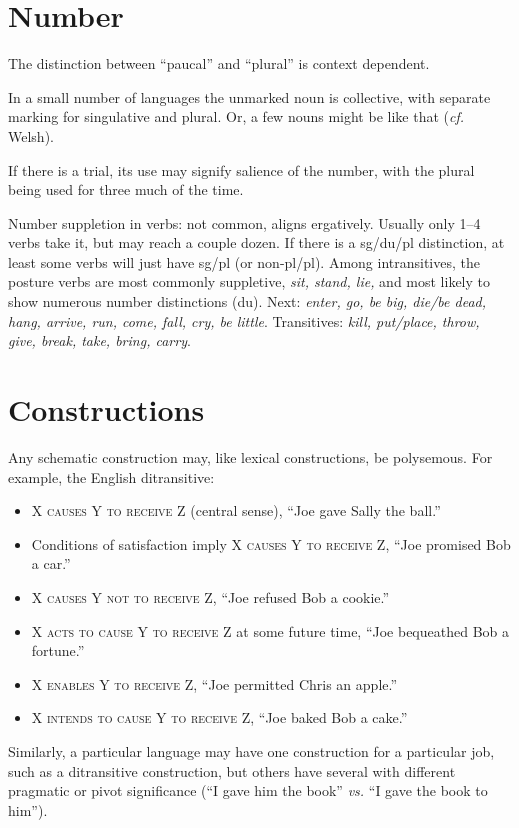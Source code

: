 \documentclass[11pt]{article}
\newcommand{\I}[1]{\textsc{#1}}   %
\newenvironment{grammarlist}%
 {\begin{itemize}\addtolength{\itemsep}{-0.5\baselineskip}\ignorespaces}%
 {\end{itemize}\ignorespacesafterend}
\begin{document}
\section{Number}
The distinction between ``paucal'' and ``plural'' is context
dependent. 

In a small number of languages the unmarked noun is collective, with
separate marking for singulative and plural.  Or, a few nouns might be
like that (\textit{cf.} Welsh).

If there is a trial, its use may signify salience of the number, with
the plural being used for three much of the time.

Number suppletion in verbs: not common, aligns ergatively.  Usually
only 1--4 verbs take it, but may reach a couple dozen.  If there is a
sg/du/pl distinction, at least some verbs will just have sg/pl (or
non-pl/pl).  Among intransitives, the posture verbs are most commonly
suppletive, \textit{sit, stand, lie,} and most likely to show numerous
number distinctions (du).  Next: \textit{enter, go, be big, die/be
  dead, hang, arrive, run, come, fall, cry, be little}.  Transitives:
\textit{kill, put/place, throw, give, break, take, bring, carry}.


\section{Constructions}
Any schematic construction may, like lexical constructions, be
polysemous.  For example, the English ditransitive:

\begin{grammarlist}
  \item \I{X causes Y to receive Z} (central sense), ``Joe gave Sally
    the ball.''
  \item Conditions of satisfaction imply \I{X causes Y to receive Z},
    ``Joe promised Bob a car.''
  \item \I{X causes Y not to receive Z}, ``Joe refused Bob a cookie.''
  \item \I{X acts to cause Y to receive Z} at some future time, ``Joe
    bequeathed Bob a fortune.''
  \item \I{X enables Y to receive Z}, ``Joe permitted Chris an
    apple.''
  \item \I{X intends to cause Y to receive Z}, ``Joe baked Bob a cake.''
\end{grammarlist}

Similarly, a particular language may have one construction for a
particular job, such as a ditransitive construction, but others have
several with different pragmatic or pivot significance (``I gave him
the book'' \textit{vs.} ``I gave the book to him'').
\end{document}
